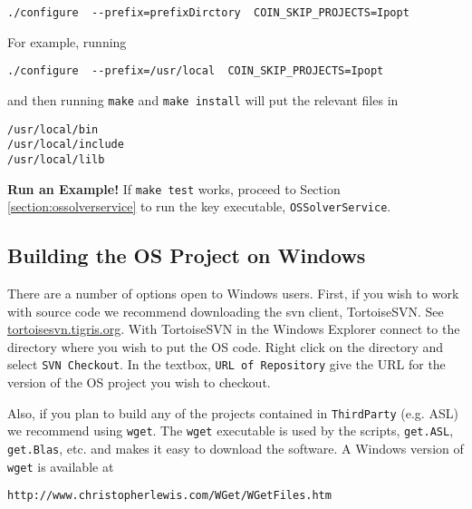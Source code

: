 \documentclass[11pt]{article}
\renewcommand{\_}{{\char"5F}}
\renewcommand{\{}{{\char"7B}}
\renewcommand{\}}{{\char"7D}}
\renewcommand{\^}{{\char"0D}}
\renewcommand{\'}{{\char"0D}}
\begin{document}
\begin{verbatim}
./configure  --prefix=prefixDirctory  COIN_SKIP_PROJECTS=Ipopt
\end{verbatim}

For example, running

\begin{verbatim}
./configure  --prefix=/usr/local  COIN_SKIP_PROJECTS=Ipopt
\end{verbatim}

\noindent and then running {\tt make} and {\tt make install} will put the relevant files in

\begin{verbatim}
/usr/local/bin
/usr/local/include
/usr/local/lilb
\end{verbatim}

\vskip 8pt

{\bf Run an Example!}  If {\tt make test} works, proceed to Section \ref{section:ossolverservice} to run the key executable, {\tt OSSolverService}. 







\subsection{Building the OS Project on Windows}\label{section:windowsintall}

There are a number of options open to Windows users.   First, if you wish to work with source code we recommend downloading  the svn client,  TortoiseSVN.  See \url{tortoisesvn.tigris.org}.  With TortoiseSVN in the Windows Explorer connect to the directory where you wish to put the OS code. Right click on the directory and select {\tt SVN Checkout}.   In the textbox, {\tt URL of Repository} give the URL for the version of the OS project you wish to checkout.   




Also, if you plan to build any of the projects contained in {\tt ThirdParty} (e.g. ASL) we recommend using {\tt wget}.  The {\tt wget} executable is used by the scripts, {\tt get.ASL}, {\tt get.Blas}, etc. and makes it easy to download the software.  A Windows version of {\tt wget} is available at

\begin{verbatim}
http://www.christopherlewis.com/WGet/WGetFiles.htm
\end{verbatim}
\end{document}

